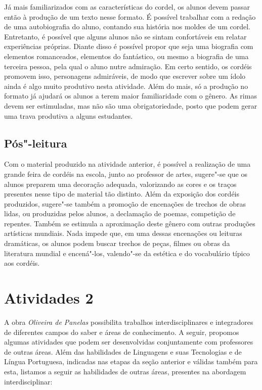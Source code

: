 \documentclass{article}
\begin{document}
Já mais
familiarizados com as características do cordel, os alunos devem passar
então à produção de um texto nesse formato. É possível trabalhar com a
redação de uma autobiografia do aluno, contando sua história nos moldes
de um cordel. Entretanto, é possível que alguns alunos não se sintam
confortáveis em relatar experiências próprias. Diante disso é possível
propor que seja uma biografia com elementos romanceados, elementos do
fantástico, ou mesmo a biografia de uma terceira pessoa, pela qual o
aluno nutre admiração. Em certo sentido, os cordéis promovem isso,
personagens admiráveis, de modo que escrever sobre um ídolo ainda é algo
muito produtivo nesta atividade. Além do mais, só a produção no formato
já ajudará os alunos a terem maior familiaridade com o gênero. As rimas
devem ser estimuladas, mas não são uma obrigatoriedade, posto que podem
gerar uma trava produtiva a alguns estudantes.

\subsection{Pós"-leitura}


Com o material
produzido na atividade anterior, é possível a realização de uma grande
feira de cordéis na escola, junto ao professor de artes, sugere"-se que
os alunos preparem uma decoração adequada, valorizando as cores e os
traços presentes nesse tipo de material tão distinto. Além da exposição
dos cordéis produzidos, sugere"-se também a promoção de encenações de
trechos de obras lidas, ou produzidas pelos alunos, a declamação de
poemas, competição de repentes. Também se estimula a aproximação deste
gênero com outras produções artísticas mundiais. Nada impede que, em uma
dessas encenações ou leituras dramáticas, os alunos podem buscar trechos
de peças, filmes ou obras da literatura mundial e encená"-los, valendo"-se
da estética e do vocabulário típico aos cordéis.


\section{Atividades 2}

A obra \emph{Oliveira de Panelas} possibilita trabalhos
interdisciplinares e integradores de diferentes campos do saber e áreas
de conhecimento. A seguir, propomos algumas atividades que podem ser
desenvolvidas conjuntamente com professores de outras áreas. Além das
habilidades de Linguagens e suas Tecnologias e de Língua Portuguesa,
indicadas nas etapas da seção anterior e válidas também para esta,
listamos a seguir as habilidades de outras áreas, presentes na abordagem
interdisciplinar:
\end{document}
